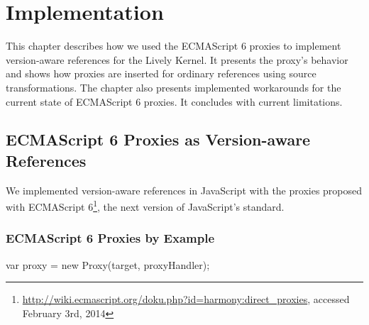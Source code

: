 

\chapter{Implementation} \label{chapter:IMPLEMENTATION}

This chapter describes how we used the ECMAScript 6 proxies to implement version-aware references for the Lively Kernel.
It presents the proxy's behavior and shows how proxies are inserted for ordinary references using source transformations.
The chapter also presents implemented workarounds for the current state of ECMAScript 6 proxies.
It concludes with current limitations.


\section{ECMAScript 6 Proxies as Version-aware References} \label{sec:IMPLEMENTATION:1}

We implemented version-aware references in JavaScript with the proxies proposed with ECMAScript 6\footnote{\url{http://wiki.ecmascript.org/doku.php?id=harmony:direct_proxies}, accessed February 3rd, 2014}, the next version of JavaScript's standard.

\subsection{ECMAScript 6 Proxies by Example}

    
    
    

\begin{code}{}{}
var proxy = new Proxy(target, proxyHandler);
\end{code}
\label{lst:example}
\iffalse
\end{verbatim}\fi

